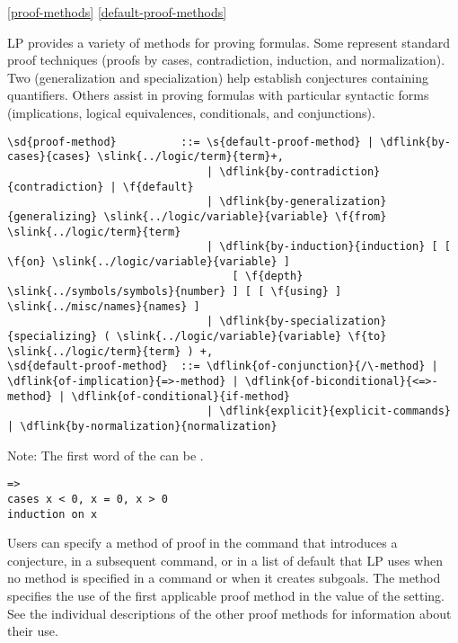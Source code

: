 \ref{proof-methods}
\ref{default-proof-methods}

LP provides a variety of methods for proving formulas.  Some represent standard
proof techniques (proofs by cases, contradiction, induction, and
normalization).  Two (generalization and specialization) help establish
conjectures containing quantifiers.  Others assist in proving formulas with
particular syntactic forms (implications, logical equivalences, conditionals,
and conjunctions).

\begin{verbatim}
\sd{proof-method}          ::= \s{default-proof-method} | \dflink{by-cases}{cases} \slink{../logic/term}{term}+,
                               | \dflink{by-contradiction}{contradiction} | \f{default}
                               | \dflink{by-generalization}{generalizing} \slink{../logic/variable}{variable} \f{from} \slink{../logic/term}{term}
                               | \dflink{by-induction}{induction} [ [ \f{on} \slink{../logic/variable}{variable} ]
                                   [ \f{depth} \slink{../symbols/symbols}{number} ] [ [ \f{using} ] \slink{../misc/names}{names} ]
                               | \dflink{by-specialization}{specializing} ( \slink{../logic/variable}{variable} \f{to} \slink{../logic/term}{term} ) +,
\sd{default-proof-method}  ::= \dflink{of-conjunction}{/\-method} | \dflink{of-implication}{=>-method} | \dflink{of-biconditional}{<=>-method} | \dflink{of-conditional}{if-method}
                               | \dflink{explicit}{explicit-commands} | \dflink{by-normalization}{normalization}
\end{verbatim}

Note: The first word of the  can be 
.

\begin{verbatim}
=>
cases x < 0, x = 0, x > 0
induction on x
\end{verbatim}

Users can specify a method of proof in the  command that
introduces a conjecture, in a subsequent  command, or in a list
of default  that LP uses when no method is
specified in a  command or when it creates subgoals.
\p
The  method specifies the use of the first applicable proof method
in the value of the  setting.  See the individual
descriptions of the other proof methods for information about their use.
